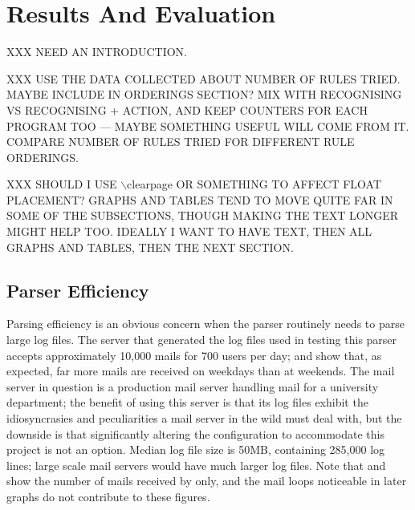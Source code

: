 \chapter{Results And Evaluation}

\label{Results}

\renewcommand{\figurename}{Graph}

XXX NEED AN INTRODUCTION\@.

XXX USE THE DATA COLLECTED ABOUT NUMBER OF RULES TRIED\@.  MAYBE INCLUDE IN
ORDERINGS SECTION\@?  MIX WITH RECOGNISING VS RECOGNISING + ACTION, AND
KEEP COUNTERS FOR EACH PROGRAM TOO --- MAYBE SOMETHING USEFUL WILL COME
FROM IT\@.  COMPARE NUMBER OF RULES TRIED FOR DIFFERENT RULE ORDERINGS\@.

XXX SHOULD I USE $\backslash{}$clearpage{} OR SOMETHING TO AFFECT FLOAT
PLACEMENT\@?  GRAPHS AND TABLES TEND TO MOVE QUITE FAR IN SOME OF THE
SUBSECTIONS, THOUGH MAKING THE TEXT LONGER MIGHT HELP TOO\@.  IDEALLY I
WANT TO HAVE TEXT, THEN ALL GRAPHS AND TABLES, THEN THE NEXT SECTION\@.

\newpage{} %

\section{Parser Efficiency}

\label{parser efficiency}

Parsing efficiency is an obvious concern when the parser routinely needs to
parse large log files.  The server that generated the log files used in
testing this parser accepts approximately 10,000 mails for 700 users per
day;  and  show that, as expected, far more mails are
received on weekdays than at weekends.  The mail server in question is a
production mail server handling mail for a university department; the
benefit of using this server is that its log files exhibit the
idiosyncrasies and peculiarities a mail server in the wild must deal with,
but the downside is that significantly altering the configuration to
accommodate this project is not an option.  Median log file size is 50MB,
containing 285,000 log lines; large scale mail servers would have much
larger log files.  Note that  and
 show the number of
mails received by  only, and the mail loops noticeable in
later graphs do not contribute to these figures.

